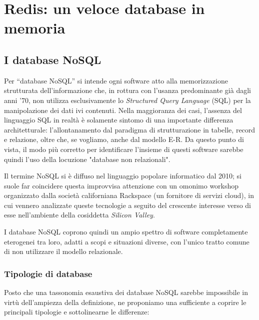 \chapter{Redis: un veloce database in memoria}

\section{I database NoSQL}

Per ``database NoSQL'' si intende ogni software atto alla memorizzazione strutturata dell'informazione
che, in rottura con l'usanza predominante già dagli anni '70, non utilizza esclusivamente lo \emph{Structured
Query Language} (SQL) per la manipolazione dei dati ivi contenuti. Nella maggioranza dei casi,
l'assenza del linguaggio SQL in realtà è solamente sintomo di una importante differenza
architetturale: l'allontanamento dal paradigma di strutturazione in tabelle, record e relazione, oltre
che, se vogliamo, anche dal modello E-R. Da questo punto di vista, il modo più corretto per identificare
l'insieme di questi software sarebbe quindi l'uso della locuzione "database non relazionali".

Il termine NoSQL si è diffuso nel linguaggio popolare informatico dal 2010; si suole far
coincidere questa improvvisa attenzione con un omonimo workshop organizzato dalla società
californiana Rackspace (un fornitore di servizi cloud), in cui vennero analizzate
queste tecnologie a seguito del crescente interesse verso di esse nell'ambiente della cosiddetta
\emph{Silicon Valley}.

I database NoSQL coprono quindi un ampio spettro di software completamente eterogenei
tra loro, adatti a scopi e situazioni diverse, con l'unico tratto comune di non
utilizzare il modello relazionale.

\subsection{Tipologie di database}

Posto che una tassonomia esaustiva dei database NoSQL sarebbe impossibile in virtù
dell'ampiezza della definizione, ne proponiamo una \cite{corbellini17} sufficiente a coprire le
principali tipologie e sottolinearne le differenze:


